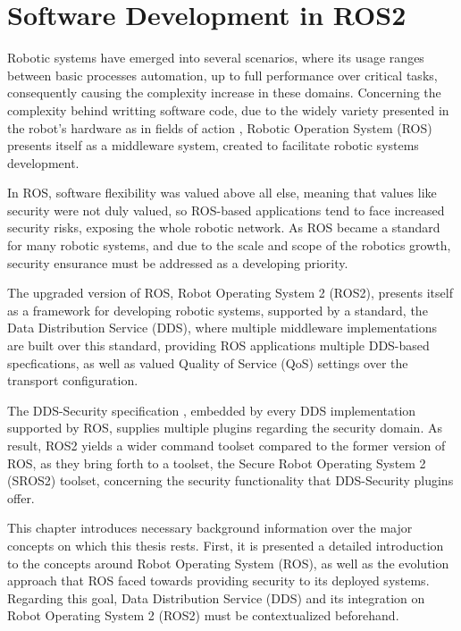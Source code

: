 \chapter{Software Development in ROS2}\label{c:ros}

Robotic systems have emerged into several scenarios, where its usage ranges between basic processes automation, up to full performance over critical tasks, consequently causing the complexity increase in these domains. Concerning the complexity behind writting software code, due to the widely variety presented in the robot's hardware as in fields of action \cite{cousins2011exponential}, Robotic Operation System (ROS) presents itself as a middleware system, created to facilitate robotic systems development.

In ROS, software flexibility was valued above all else, meaning that values like security were not duly valued, so ROS-based applications tend to face increased security risks, exposing the whole robotic network. As ROS became a standard for many robotic systems, and due to the scale and scope of the robotics growth, security ensurance must be addressed as a developing priority. \cite{diluoffo2018robot, kim2018security}

The upgraded version of ROS, Robot Operating System 2 (ROS2), presents itself as a framework for developing robotic systems, supported by a standard, the Data Distribution Service (DDS), where multiple middleware implementations are built over this standard, providing ROS applications multiple DDS-based specfications, as well as valued Quality of Service (QoS) settings over the transport configuration. 

The DDS-Security specification \cite{dds-s}, embedded by every DDS implementation supported by ROS, supplies multiple plugins regarding the security domain. As result, ROS2 yields a wider command toolset compared to the former version of ROS, as they bring forth to a toolset, the Secure Robot Operating System 2 (SROS2) toolset, concerning the security functionality that DDS-Security plugins offer.

This chapter introduces necessary background information over the major concepts on which this thesis rests. First, it is presented a detailed introduction to the concepts around Robot Operating System (ROS), as well as the evolution approach that ROS faced towards providing security to its deployed systems. Regarding this goal, Data Distribution Service (DDS) and its integration on Robot Operating System 2 (ROS2) must be contextualized beforehand.


